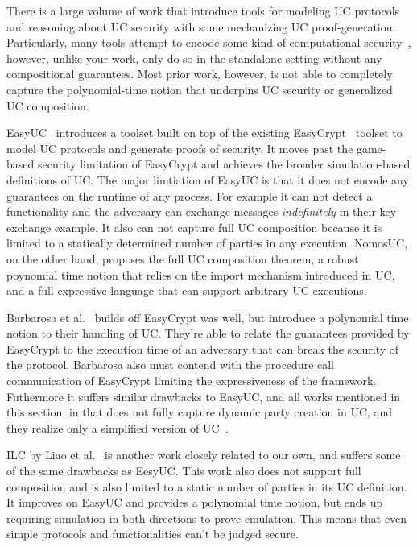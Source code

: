 There is a large volume of work that introduce tools for modeling UC protocols and reasoning about UC security with some mechanizing UC proof-generation.
Particularly, many tools attempt to encode some kind of computational security~\cite{certicrypt, easycrypt, cryptoverif, cryptol, fstar}, however, unlike your work, only do so in the standalone setting without any compositional guarantees.
Most prior work, however, is not able to completely capture the polynomial-time notion that underpins UC security or generalized UC composition. 

EasyUC~\cite{easyuc} introduces a toolset built on top of the existing EasyCrypt~\cite{easycrypt} toolset to model UC protocols and generate proofs of security.
It moves past the game-based security limitation of EasyCrypt and achieves the broader simulation-based definitions of UC.
The major limtiation of EasyUC is that it does not encode any guarantees on the runtime of any process.
For example it can not detect a functionality and the adversary can exchange messages \emph{indefinitely} in their key exchange example. It also can not capture full UC composition because it is limited to a statically determined number of parties in any execution.
NomosUC, on the other hand, proposes the full UC composition theorem, a robust poynomial time notion that relies on the import mechanism introduced in UC, and a full expressive language that can support arbitrary UC executions.

Barbarosa et al.~\cite{barbarosa} builds off EasyCrypt was well, but introduce a polynomial time notion to their handling of UC. 
They're able to relate the guarantees provided by EasyCrypt to the execution time of an adversary that can break the security of the protocol. 
Barbarosa also must contend with the procedure call communication of EasyCrypt limiting the expressiveness of the framework. 
Futhermore it suffers similar drawbacks to EasyUC, and all works mentioned in this section, in that does not fully capture dynamic party creation in UC, and they realize only a simplified version of UC~\cite{suc}.

ILC by Liao et al.~\cite{ilc} is another work closely related to our own, and suffers some of the same drawbacks as EesyUC. 
This work also does not support full composition and is also limited to a static number of parties in its UC definition.
It improves on EasyUC and provides a polynomial time notion, but ends up requiring simulation in both directions to prove emulation. This means that even simple protocols and functionalities can't be judged secure.

